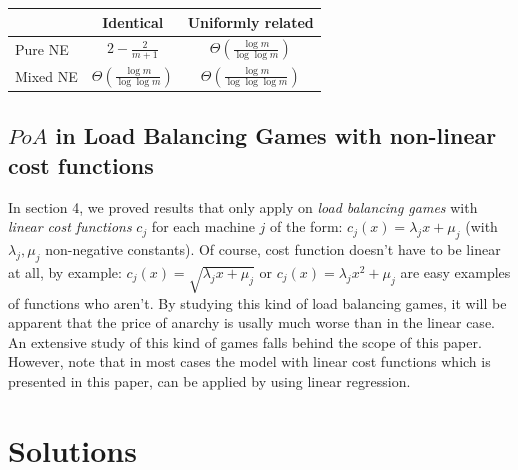 \documentclass[a4paper,11pt]{article}
\begin{document}
\begin{center}
\begin{tabular}{l|c|c}

   & Identical & Uniformly related \\
   \hline

   \hline
  Pure NE & $2-\frac{2}{m+1}$ & $\Theta\left(\frac{\log m}{\log \log m}\right)$ \\
  \hline
  Mixed NE & $\Theta\left(\frac{\log m}{\log \log m}\right)$ & $\Theta\left(\frac{\log m}{\log \log \log m}\right)$ \\
  \hline
\end{tabular}
\end{center}
\subsection{$PoA$ in Load Balancing Games with non-linear cost functions}
In section 4, we proved results that only apply on \emph{load balancing games} with \emph{linear cost functions} $c_j$ for each machine $j$ of the form: $c_j(x) = \lambda_jx+\mu_j$ (with $\lambda_j, \mu_j$ non-negative constants). Of course, cost function doesn't have to be linear at all, by example: $c_j(x) = \sqrt{\lambda_jx+\mu_j}$ or $c_j(x) =\lambda_jx^2+\mu_j$ are easy examples of functions who aren't. By studying this kind of load balancing games, it will be apparent that the price of anarchy is usally much worse than in the linear case. An extensive study of this kind of games falls behind the scope of this paper. However, note that in most cases the model with linear cost functions which is presented in this paper, can be applied by using linear regression.
\section{Solutions}
\end{document}
